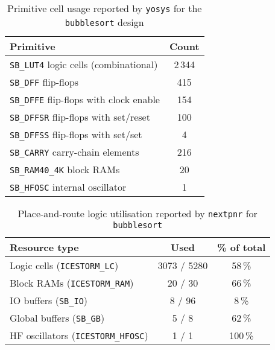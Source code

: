 \documentclass[a4paper,10pt]{article}
\begin{document}
\begin{table}[H]
    \centering
    \begin{tabular}{|l|c|}
        \hline
        \textbf{Primitive} & \textbf{Count} \\
        \hline
        \texttt{SB\_LUT4} logic cells (combinational) & 2\,344 \\
        \texttt{SB\_DFF} flip-flops & 415 \\
        \texttt{SB\_DFFE} flip-flops with clock enable & 154 \\
        \texttt{SB\_DFFSR} flip-flops with set/reset & 100 \\
        \texttt{SB\_DFFSS} flip-flops with set/set & 4 \\
        \texttt{SB\_CARRY} carry-chain elements & 216 \\
        \texttt{SB\_RAM40\_4K} block RAMs & 20 \\
        \texttt{SB\_HFOSC} internal oscillator & 1 \\
        \hline
    \end{tabular}
    \caption{Primitive cell usage reported by 
    \texttt{yosys} for the \texttt{bubblesort} design}
    \label{tab:bubblesort_yosys_report}
\end{table}

\begin{table}[H]
    \centering
    \begin{tabularx}{0.6\textwidth}{X c c}
        \toprule
        Resource type & Used & \% of total \\ \midrule
        Logic cells (\texttt{ICESTORM\_LC}) & 3073 / 5280 & 58\,\% \\
        Block RAMs (\texttt{ICESTORM\_RAM}) & 20 / 30 & 66\,\% \\
        IO buffers (\texttt{SB\_IO}) & 8 / 96 & 8\,\% \\
        Global buffers (\texttt{SB\_GB}) & 5 / 8 & 62\,\% \\
        HF oscillators (\texttt{ICESTORM\_HFOSC}) & 1 / 1 & 100\,\% \\
        \bottomrule
    \end{tabularx}
    \caption{Place-and-route logic utilisation reported by 
    \texttt{nextpnr} for \texttt{bubblesort}}
    \label{tab:bubblesort_pnr_report}
\end{table}
\end{document}

